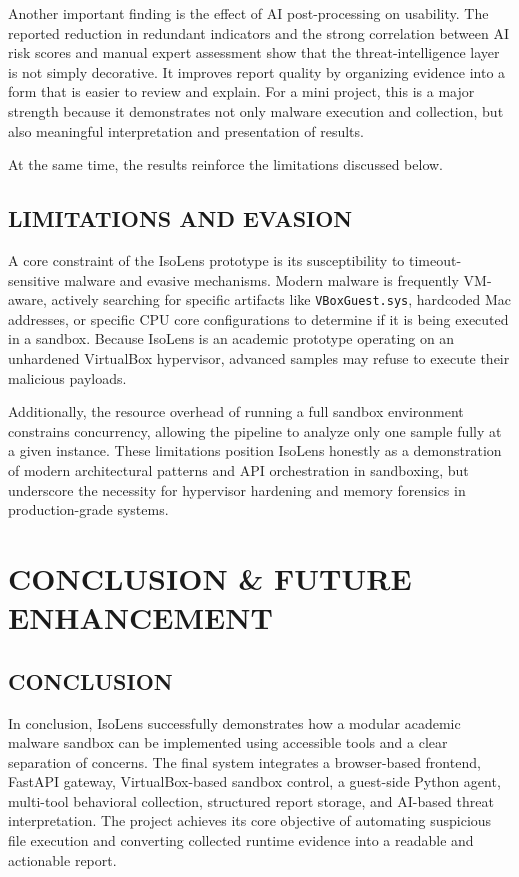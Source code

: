 \documentclass[a4paper,12pt,oneside]{report}
\begin{document}
\par

\par

Another important finding is the effect of AI post-processing on usability. The reported reduction in redundant indicators and the strong correlation between AI risk scores and manual expert assessment show that the threat-intelligence layer is not simply decorative. It improves report quality by organizing evidence into a form that is easier to review and explain. For a mini project, this is a major strength because it demonstrates not only malware execution and collection, but also meaningful interpretation and presentation of results.

At the same time, the results reinforce the limitations discussed below.

\section{LIMITATIONS AND EVASION}
A core constraint of the IsoLens prototype is its susceptibility to timeout-sensitive malware and evasive mechanisms. Modern malware is frequently VM-aware, actively searching for specific artifacts like \texttt{VBoxGuest.sys}, hardcoded Mac addresses, or specific CPU core configurations to determine if it is being executed in a sandbox. Because IsoLens is an academic prototype operating on an unhardened VirtualBox hypervisor, advanced samples may refuse to execute their malicious payloads. 

\par

\par

Additionally, the resource overhead of running a full sandbox environment constrains concurrency, allowing the pipeline to analyze only one sample fully at a given instance. These limitations position IsoLens honestly as a demonstration of modern architectural patterns and API orchestration in sandboxing, but underscore the necessity for hypervisor hardening and memory forensics in production-grade systems.

\chapter{CONCLUSION \& FUTURE ENHANCEMENT}
\section{CONCLUSION}
In conclusion, IsoLens successfully demonstrates how a modular academic malware sandbox can be implemented using accessible tools and a clear separation of concerns. The final system integrates a browser-based frontend, FastAPI gateway, VirtualBox-based sandbox control, a guest-side Python agent, multi-tool behavioral collection, structured report storage, and AI-based threat interpretation. The project achieves its core objective of automating suspicious file execution and converting collected runtime evidence into a readable and actionable report.
\end{document}
